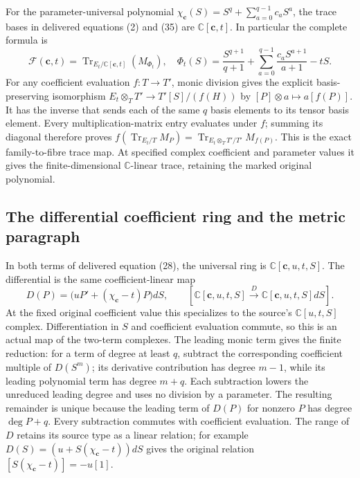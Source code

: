 For the parameter-universal polynomial
$\chi_{\mathbf c}(S)=S^q+\sum_{a=0}^{q-1}c_aS^a$, the trace bases
in delivered equations (2) and (35) are
$\mathbb C[\mathbf c,t]$.  In particular the complete formula is
\[
 \mathcal F(\mathbf c,t)
 =\operatorname{Tr}_{E_t/\mathbb C[\mathbf c,t]}(M_{\Phi_t}),
 \quad
 \Phi_t(S)=\frac{S^{q+1}}{q+1}
       +\sum_{a=0}^{q-1}\frac{c_aS^{a+1}}{a+1}-tS.
 \tag{SGAC5}
\]
For any coefficient evaluation $f:T\to T'$, monic division gives
the explicit basis-preserving isomorphism
$E_t\otimes_TT'\to T'[S]/(f(H))$ by
$[P]\otimes a\mapsto a[f(P)]$.  It has the inverse that sends
each of the same $q$ basis elements to its tensor basis element.
Every multiplication-matrix entry evaluates under $f$; summing its
diagonal therefore proves
$f(\operatorname{Tr}_{E_t/T}M_P)
=\operatorname{Tr}_{E_t\otimes_TT'/T'}M_{f(P)}$.
This is the exact family-to-fibre trace map.  At specified complex
coefficient and parameter values it gives the finite-dimensional
$\mathbb C$-linear trace, retaining the marked original polynomial.

\subsection{The differential coefficient ring and the metric paragraph}

In both terms of delivered equation (28), the universal ring is
$\mathbb C[\mathbf c,u,t,S]$.  The differential is the same
coefficient-linear map
\[
 D(P)=\bigl(uP'+(\chi_{\mathbf c}-t)P\bigr)dS,
 \qquad
 [\mathbb C[\mathbf c,u,t,S]\xrightarrow{D}
      \mathbb C[\mathbf c,u,t,S]dS].
 \tag{SGAC6}
\]
At the fixed original coefficient value this specializes to the
source's $\mathbb C[u,t,S]$ complex.  Differentiation in $S$ and
coefficient evaluation commute, so this is an actual map of the
two-term complexes.  The leading monic term gives the finite
reduction: for a term of degree at least $q$, subtract the corresponding
coefficient multiple of $D(S^m)$; its derivative contribution has
degree $m-1$, while its leading polynomial term has degree $m+q$.
Each subtraction lowers the unreduced leading degree and uses no
division by a parameter.  The resulting remainder is unique because
the leading term of $D(P)$ for nonzero $P$ has degree $\deg P+q$.
Every subtraction commutes with coefficient evaluation.  The range
of $D$ retains its source type as a linear relation; for example
$D(S)=(u+S(\chi_{\mathbf c}-t))dS$ gives the original relation
$[S(\chi_{\mathbf c}-t)]=-u[1]$.

